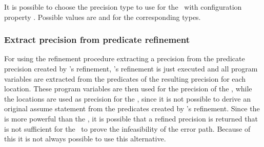 It is possible to choose the precision type to use for the \constraintsCPA\ with configuration property .
Possible values are  and  for the corresponding types.

\subsubsection{Extract precision from predicate refinement}
For using the refinement procedure extracting a precision from the predicate precision created by \predicateCPA's refinement, \predicateCPA's refinement is just executed
and all program variables are extracted from the predicates of the resulting precision for each location.
These program variables are then used for the precision of the , while the locations are used as precision for the \constraintsCPA, since it is not possible to derive an original assume statement from the predicates created by \predicateCPA's refinement.
Since the \predicateCPA is more powerful than the \symbolicExecutionCPA, it is possible that a refined precision is returned that is not sufficient for the \symbolicExecutionCPA\ to prove the infeasibility of the error path.
Because of this it is not always possible to use this alternative.